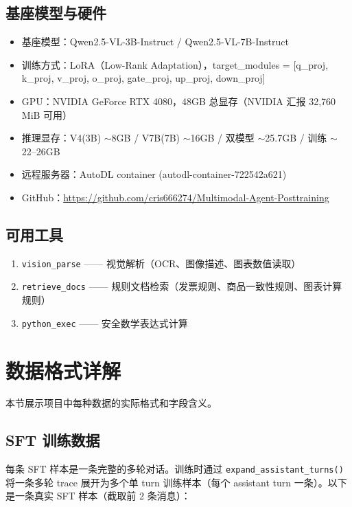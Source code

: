 \documentclass[12pt,a4paper]{ctexart}
\begin{document}
\subsection{基座模型与硬件}

\begin{itemize}[nosep]
  \item 基座模型：Qwen2.5-VL-3B-Instruct / Qwen2.5-VL-7B-Instruct
  \item 训练方式：LoRA（Low-Rank Adaptation），target\_modules = [q\_proj, k\_proj, v\_proj, o\_proj, gate\_proj, up\_proj, down\_proj]
  \item GPU：NVIDIA GeForce RTX 4080，48GB 总显存（NVIDIA 汇报 32,760 MiB 可用）
  \item 推理显存：V4(3B) $\sim$8GB / V7B(7B) $\sim$16GB / 双模型 $\sim$25.7GB / 训练 $\sim$22--26GB
  \item 远程服务器：AutoDL container (autodl-container-722542a621)
  \item GitHub：\url{https://github.com/cris666274/Multimodal-Agent-Posttraining}
\end{itemize}

\subsection{可用工具}

\begin{enumerate}[nosep]
  \item \texttt{vision\_parse} —— 视觉解析（OCR、图像描述、图表数值读取）
  \item \texttt{retrieve\_docs} —— 规则文档检索（发票规则、商品一致性规则、图表计算规则）
  \item \texttt{python\_exec} —— 安全数学表达式计算
\end{enumerate}

\section{数据格式详解}

本节展示项目中每种数据的实际格式和字段含义。

\subsection{SFT 训练数据}

每条 SFT 样本是一条完整的多轮对话。训练时通过 \texttt{expand\_assistant\_turns()} 将一条多轮 trace 展开为多个单 turn 训练样本（每个 assistant turn 一条）。以下是一条真实 SFT 样本（截取前 2 条消息）：
\end{document}
